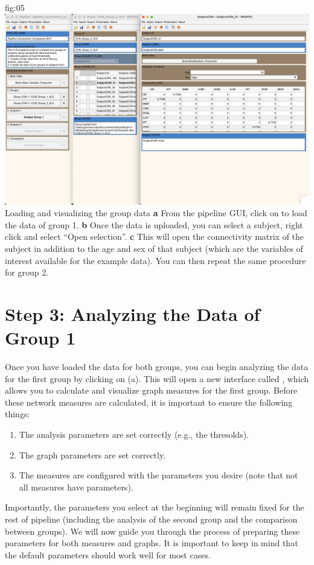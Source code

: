 \documentclass[justified]{tufte-handout}
\begin{document}
	{fig:05}
	{
	\includegraphics{fig05.jpg}
	}
	{Loading and visualizing the group data}
	{
	{\bf a} From the pipeline GUI, click on  to load the data of group 1.
	{\bf b} Once the data is uploaded, you can select a subject, right click and select ``Open selection''.
	{\bf c} This will open the connectivity matrix of the subject in addition to the age and sex of that subject (which are the variables of interest available for the example data).
	You can then repeat the same procedure for group 2.
	}

\clearpage
\section{Step 3: Analyzing the Data of Group 1}

Once you have loaded the data for both groups, you can begin analyzing the data for the first group by clicking on  (a). 
This will open a new interface called , which allows you to calculate and visualize graph measures for the first group. 
Before these network measures are calculated, it is important to ensure the following things: 
\begin{enumerate}
	\item The analysis parameters are set correctly (e.g., the thresolds).
	\item The graph parameters are set correctly.
	\item The measures are configured with the parameters you desire (note that not all measures have parameters).
\end{enumerate}

Importantly, the parameters you select at the beginning will remain fixed for the rest of pipeline (including the analysis of the second group and the comparison between groups). We will now guide you through the process of preparing these parameters for both measures and graphs. It is important to keep in mind that the default parameters should work well for most cases.
\end{document}
